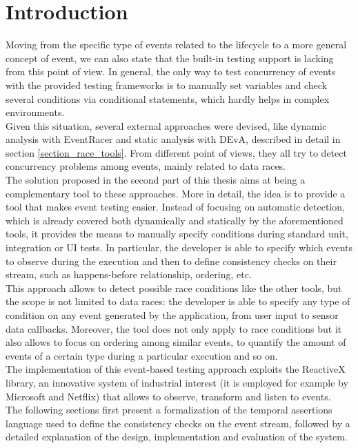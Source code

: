 \documentclass[11pt,a4paper,notitlepage]{article}
\begin{document}
\section{Introduction}
Moving from the specific type of events related to the lifecycle to a more general concept of event, we can also state that the built-in testing support is lacking from this point of view. In general, the only way to test concurrency of events with the provided testing frameworks is to manually set variables and check several conditions via conditional statements, which hardly helps in complex environments.\medskip \\
Given this situation, several external approaches were devised, like dynamic analysis with EventRacer and static analysis with DEvA, described in detail in section \ref{section_race_tools}. From different point of views, they all try to detect concurrency problems among events, mainly related to data races.\medskip \\
The solution proposed in the second part of this thesis aims at being a complementary tool to these approaches. More in detail, the idea is to provide a tool that makes event testing easier. Instead of focusing on automatic detection, which is already covered both dynamically and statically by the aforementioned tools, it provides the means to manually specify conditions during standard unit, integration or UI tests. In particular, the developer is able to specify which events to observe during the execution and then to define consistency checks on their stream, such as happens-before relationship, ordering, etc.\medskip \\
This approach allows to detect possible race conditions like the other tools, but the scope is not limited to data races: the developer is able to specify any type of condition on any event generated by the application, from user input to sensor data callbacks. Moreover, the tool does not only apply to race conditions but it also allows to focus on ordering among similar events, to quantify the amount of events of a certain type during a particular execution and so on.\medskip \\
The implementation of this event-based testing approach exploits the ReactiveX library, an innovative system of industrial interest (it is employed for example by Microsoft and Netflix) that allows to observe, transform and listen to events.\medskip \\
The following sections first present a formalization of the temporal assertions language used to define the consistency checks on the event stream, followed by a detailed explanation of the design, implementation and evaluation of the system.
\end{document}
